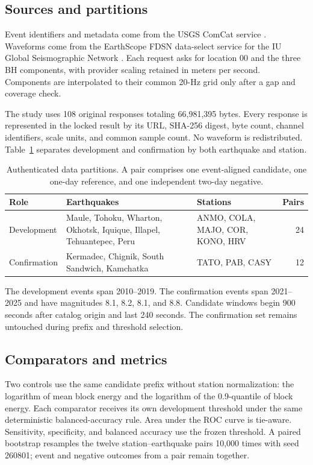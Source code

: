 \documentclass[10pt,letterpaper,twoside]{article}
\begin{document}
\subsection{Sources and partitions}

Event identifiers and metadata come from the USGS ComCat service
\cite{usgs2026comcat}.  Waveforms come from the EarthScope FDSN data-select
service for the IU Global Seismographic Network
\cite{iu1988network,earthscope2026gsn,earthscope2026fdsn}.  Each request asks
for location 00 and the three BH components, with provider scaling retained
in meters per second.  Components are interpolated to their common 20-Hz
grid only after a gap and coverage check.

The study uses 108 original responses totaling 66,981,395 bytes.  Every
response is represented in the locked result by its URL, SHA-256 digest,
byte count, channel identifiers, scale units, and common sample count.  No
waveform is redistributed.  Table~\ref{tab:data} separates development and
confirmation by both earthquake and station.

\begin{table}[H]
\centering
\caption{Authenticated data partitions.  A pair comprises one event-aligned
candidate, one one-day reference, and one independent two-day negative.}
\label{tab:data}
\small
\begin{tabularx}{\columnwidth}{@{}lXXr@{}}
\toprule
Role & Earthquakes & Stations & Pairs \\
\midrule
Development
& Maule, Tohoku, Wharton, Okhotsk, Iquique, Illapel, Tehuantepec, Peru
& ANMO, COLA, MAJO, COR, KONO, HRV
& 24 \\
Confirmation
& Kermadec, Chignik, South Sandwich, Kamchatka
& TATO, PAB, CASY
& 12 \\
\bottomrule
\end{tabularx}
\end{table}

The development events span 2010--2019.  The confirmation events span
2021--2025 and have magnitudes 8.1, 8.2, 8.1, and 8.8.  Candidate windows
begin 900 seconds after catalog origin and last 240 seconds.  The confirmation
set remains untouched during prefix and threshold selection.

\subsection{Comparators and metrics}

Two controls use the same candidate prefix without station normalization:
the logarithm of mean block energy and the logarithm of the 0.9-quantile of
block energy.  Each comparator receives its own development threshold under
the same deterministic balanced-accuracy rule.  Area under the ROC curve is
tie-aware.  Sensitivity, specificity, and balanced accuracy use the frozen
threshold.  A paired bootstrap resamples the twelve station--earthquake pairs
10,000 times with seed 260801; event and negative outcomes from a pair remain
together.
\end{document}
